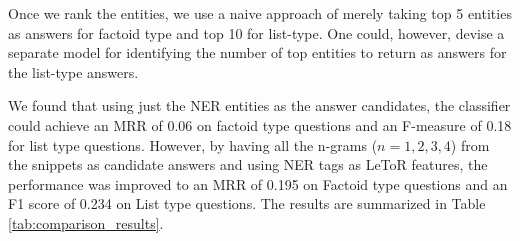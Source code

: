 \documentclass[11pt,a4paper]{article}
\begin{document}
Once we rank the entities, we use a naive approach of merely taking top 5 entities as answers for factoid type and top 10 for list-type. One could, however, devise a separate model for identifying the number of top entities to return as answers for the list-type answers. 

We found that using just the NER entities as the answer candidates, the classifier could achieve an MRR of 0.06 on factoid type questions and an F-measure of 0.18 for list type questions. However, by having all the n-grams ($n = 1, 2, 3, 4$) from the snippets as candidate answers and using NER tags as LeToR features, the performance was improved to an MRR of 0.195 on Factoid type questions and an F1 score of 0.234  on List type questions. The results are summarized in Table \ref{tab:comparison_results}.




\end{document}
